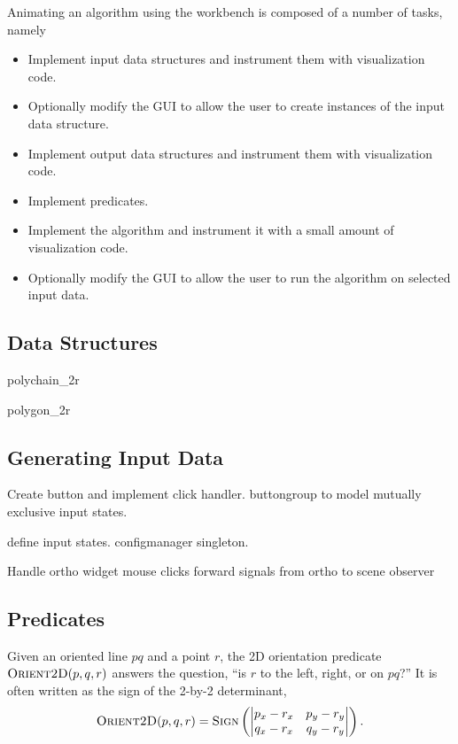 Animating an algorithm using the workbench is composed of a number of tasks,
namely 
\begin{itemize}
  \item Implement input data structures and instrument them with visualization
  code.
  \item Optionally modify the GUI to allow the user to create instances of
  the input data structure.
  \item Implement output data structures and instrument them with visualization
  code.
  \item Implement predicates.
  \item Implement the algorithm and instrument it with a small amount of
  visualization code.
  \item Optionally modify the GUI to allow the user to run the algorithm on
  selected input data. 
\end{itemize}

\subsection{Data Structures}

polychain\_2r

polygon\_2r

\subsection{Generating Input Data}




Create button and implement click handler. buttongroup to model mutually
exclusive input states.

define input states. configmanager singleton. 



Handle ortho widget mouse clicks
forward signals from ortho to scene observer

\subsection{Predicates}

Given an oriented line $pq$ and a point $r$, the 2D orientation predicate
$\textsc{Orient2D}(p, q, r)$ answers the question, ``is $r$ to the left, right,
or on $pq$?'' It is often written as the sign of the 2-by-2 determinant, $$
\textsc{Orient2D}(p, q, r) = \textsc{Sign}\left( \begin{vmatrix} p_x-r_x &
p_y-r_y \\ q_x-r_x & q_y-r_y \end{vmatrix} \right).$$












